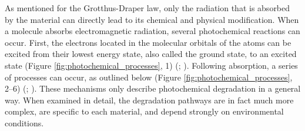 As mentioned for the Grotthus-Draper law, only the radiation that is absorbed by the material can directly lead to its chemical and physical modification. When a molecule absorbs electromagnetic radiation, several photochemical reactions can occur. First, the electrons located in the molecular orbitals of the atoms can be excited from their lowest energy state, also called the ground state, to an excited state (Figure \ref{fig:photochemical_processes}, 1) (\citealp[18]{christie_colour_2001}; \citealp[176]{van_beek_light-induced_1983}). Following absorption, a series of processes can occur, as outlined below (Figure \ref{fig:photochemical_processes}, 2–6) (\citealp[6]{schaeffer_effects_2001}; \citealp[49]{feller_accelerated_1994}). These mechanisms only describe photochemical degradation in a general way. When examined in detail, the degradation pathways are in fact much more complex, are specific to each material, and depend strongly on environmental conditions. \\



